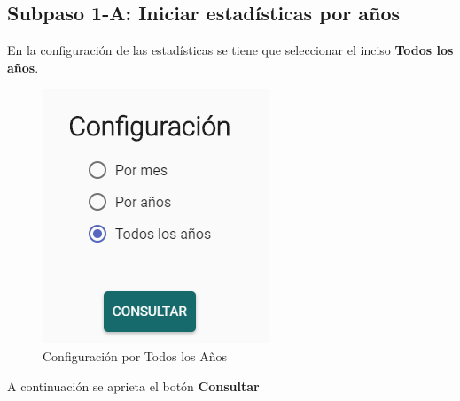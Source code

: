 \subsection{Subpaso 1-A: Iniciar estadísticas por años}
	En la configuración de las estadísticas se tiene que seleccionar el 
	inciso \textbf{Todos los años}.
		
	\begin{figure}[hbtp]

	\includegraphics[scale=0.5]{images/InterfazMovil/IUGS15_configuracioTodos.PNG}
	\caption{Configuración por Todos los Años }
	\end{figure}
	A continuación se aprieta el botón \textbf{Consultar}
	
